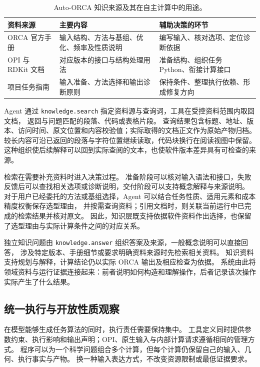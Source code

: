 \documentclass[UTF8,fontset=fandol,a4paper,11pt]{ctexart}
\newcommand{\code}[1]{\texttt{#1}}
\begin{document}
\begin{table}[H]
  \centering\small
  \caption{Auto-ORCA 知识来源及其在自主计算中的用途。}
  \label{tab:knowledge-sources}
  \begin{tabularx}{\linewidth}{p{2.8cm}YY}
    \toprule
    资料来源 & 主要内容 & 辅助决策的环节\\
    \midrule
    ORCA 官方手册 & 输入结构、方法与基组、优化、频率及性质说明 & 编写输入、核对选项、定位诊断依据\\
    OPI 与 RDKit 文档 & 对应版本的接口与结构处理用法 & 准备结构、组织任务 Python、衔接计算接口\\
    项目任务指南 & 输入准备、方法选择和输出诊断原则 & 保持条件、整理执行依赖、形成修复方向\\
    \bottomrule
  \end{tabularx}
\end{table}

Agent 通过 \code{knowledge.search} 指定资料源与查询词，工具在受控资料范围内取回文档，%
返回与问题匹配的段落、代码或表格片段。%
查询结果包含标题、地址、版本、访问时间、原文位置和内容校验值；实际取得的文档正文作为原始产物归档。%
较长内容可沿已返回的段落与字符位置继续读取，代码块换行在阅读视图中保留。%
这种组织使后续解释可以回到实际查阅的文本，也使软件版本差异具有可检查的来源。

检索在需要补充资料时进入决策过程。%
准备阶段可以核对输入语法和接口，失败反馈后可以查找相关选项或诊断说明，交付阶段可以支持概念解释与来源说明。%
对于用户已经委托的方法或基组选择，Agent 可以结合任务性质、适用元素和成本精度权衡保存选型理由，%
并按需查询资料；引用文档时，则关联当前运行中已完成的检索结果并核对原文。%
因此，知识层既支持依据软件资料作出选择，也保留了选型理由与实际计算条件之间的对应关系。

独立知识问题由 \code{knowledge.answer} 组织答案及来源，一般概念说明可以直接回答，%
涉及特定版本、手册细节或要求明确资料来源时先检索相关资料。%
知识资料支持规划与解释，计算结论仍以实际 ORCA 输出及相应检查为依据。%
系统由此将领域资料与运行证据连接起来：前者说明如何构造和理解操作，后者记录该次操作实际产生了什么结果。

\subsection{统一执行与开放性质观察}
在模型能够生成任务算法的同时，执行责任需要保持集中。%
工具定义同时提供参数约束、执行影响和输出声明；OPI、原生输入与内部计算请求遵循相同的管理方式。%
程序可以为一个科学问题组合多个计算，但每个计算仍保留自己的输入、几何、执行事实与产物。%
换一种输入表达方式，不改变资源限制或最低证据要求。
\end{document}
